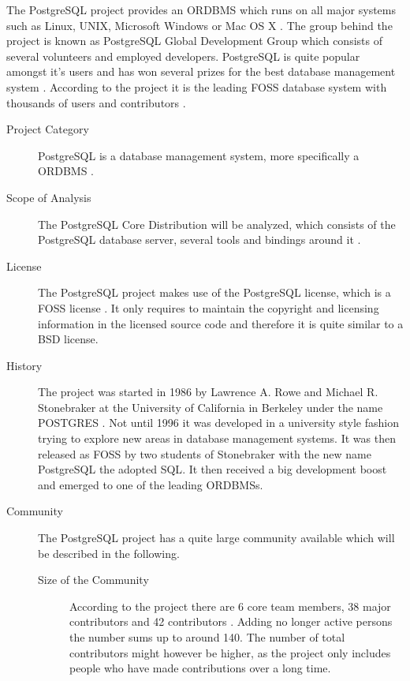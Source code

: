 The PostgreSQL project provides an \ac{ORDBMS} which runs on all major systems
such as Linux, UNIX, Microsoft Windows or Mac OS X
\cite{PostgreSQLAbout,PostgreSQLFAQ}. The group behind the project is known as
PostgreSQL Global Development Group which consists of several volunteers and
employed developers. PostgreSQL is quite popular amongst it's users and has won
several prizes for the best database management system \cite{PostgreSQLAwards}.
According to the project it is the leading \ac{FOSS} database system with
thousands of users and contributors \cite{PostgreSQLPressKit}.

\begin{description}

  \item[Project Category] PostgreSQL is a database management system, more
    specifically a \ac{ORDBMS} \cite{PostgreSQLAbout}.

  \item[Scope of Analysis] The PostgreSQL Core Distribution will be analyzed,
    which consists of the PostgreSQL database server, several tools and
    bindings around it \cite{PostgreSQLDownload}.

  \item[License] The PostgreSQL project makes use of the PostgreSQL license,
    which is a \ac{FOSS} license \cite{PostgreSQLFAQ,PostgreSQLLicense}. It
    only requires to maintain the copyright and licensing information in the
    licensed source code and therefore it is quite similar to a BSD license.

  \item[History] The project was started in 1986 by Lawrence A. Rowe and
    Michael R. Stonebraker at the University of California in Berkeley under
    the name POSTGRES \cite{PostgreSQLHistory}. Not until 1996 it was developed
    in a university style fashion trying to explore new areas in database
    management systems. It was then released as \ac{FOSS} by two students of
    Stonebraker with the new name PostgreSQL the adopted \ac{SQL}. It then
    received a big development boost and emerged to one of the leading
    \acp{ORDBMS}.

  \item[Community] The PostgreSQL project has a quite large community available
    which will be described in the following.

  \begin{description}

    \item[Size of the Community] According to the project there are 6 core team
      members, 38 major contributors and 42 contributors
      \cite{PostgreSQLContributors}. Adding no longer active persons the number
      sums up to around 140. The number of total contributors might however be
      higher, as the project only includes people who have made contributions
      over a long time.


\end{description}
\end{description}
